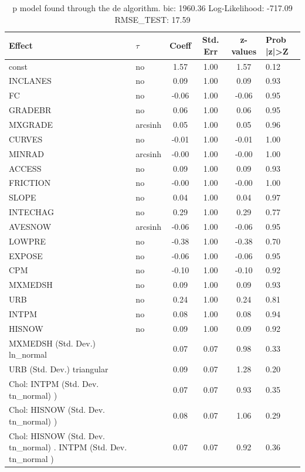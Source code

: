 \begin{table}
	\caption{p model found through the de algorithm. bic: 1960.36 Log-Likelihood: -717.09 RMSE_TEST: 17.59}
	\begin{center}
		\begin{tabular}{|l|l|c|c|c|l|}
			\hline
			Effect & $\tau$ & Coeff & Std. Err & z-values & Prob |z|>Z \\
			\hline
			const & no & 1.57 & 1.00 & 1.57 & 0.12 \\
			\hline
			INCLANES & no & 0.09 & 1.00 & 0.09 & 0.93 \\
			\hline
			FC & no & -0.06 & 1.00 & -0.06 & 0.95 \\
			\hline
			GRADEBR & no & 0.06 & 1.00 & 0.06 & 0.95 \\
			\hline
			MXGRADE & arcsinh & 0.05 & 1.00 & 0.05 & 0.96 \\
			\hline
			CURVES & no & -0.01 & 1.00 & -0.01 & 1.00 \\
			\hline
			MINRAD & arcsinh & -0.00 & 1.00 & -0.00 & 1.00 \\
			\hline
			ACCESS & no & 0.09 & 1.00 & 0.09 & 0.93 \\
			\hline
			FRICTION & no & -0.00 & 1.00 & -0.00 & 1.00 \\
			\hline
			SLOPE & no & 0.04 & 1.00 & 0.04 & 0.97 \\
			\hline
			INTECHAG & no & 0.29 & 1.00 & 0.29 & 0.77 \\
			\hline
			AVESNOW & arcsinh & -0.06 & 1.00 & -0.06 & 0.95 \\
			\hline
			LOWPRE & no & -0.38 & 1.00 & -0.38 & 0.70 \\
			\hline
			EXPOSE & no & -0.06 & 1.00 & -0.06 & 0.95 \\
			\hline
			CPM & no & -0.10 & 1.00 & -0.10 & 0.92 \\
			\hline
			MXMEDSH & no & 0.09 & 1.00 & 0.09 & 0.93 \\
			\hline
			URB & no & 0.24 & 1.00 & 0.24 & 0.81 \\
			\hline
			INTPM & no & 0.08 & 1.00 & 0.08 & 0.94 \\
			\hline
			HISNOW & no & 0.09 & 1.00 & 0.09 & 0.92 \\
			\hline
			MXMEDSH (Std. Dev.) ln_normal &  & 0.07 & 0.07 & 0.98 & 0.33 \\
			\hline
			URB (Std. Dev.) triangular &  & 0.09 & 0.07 & 1.28 & 0.20 \\
			\hline
			 Chol: INTPM (Std. Dev. tn_normal) ) &  & 0.07 & 0.07 & 0.93 & 0.35 \\
			\hline
			 Chol: HISNOW (Std. Dev. tn_normal) ) &  & 0.08 & 0.07 & 1.06 & 0.29 \\
			\hline
			 Chol: HISNOW (Std. Dev. tn_normal) . INTPM (Std. Dev.   tn_normal ) &  & 0.07 & 0.07 & 0.92 & 0.36 \\
			\hline
		\end{tabular}
	\end{center}
\end{table}